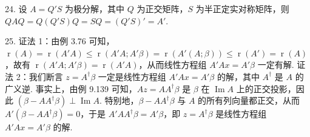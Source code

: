 \documentclass[UTF8,12pt,a4paper,fontset=fandol]{ctexart}
\begin{document}
24. 设 $A=Q'S$ 为极分解，其中 $Q$ 为正交矩阵，$S$ 为半正定实对称矩阵，则 $QAQ=Q(Q'S)Q=SQ=(Q'S)'=A'$.

25. 证法 1：由例 3.76 可知，$\operatorname{r}(A)=\operatorname{r}(A'A)\le \operatorname{r}(A'A;A'\beta)=\operatorname{r}(A'(A;\beta))\le \operatorname{r}(A')=\operatorname{r}(A)$，故有 $\operatorname{r}(A'A;A'\beta)=\operatorname{r}(A'A)$，从而线性方程组 $A'Ax=A'\beta$ 一定有解. 证法 2：我们断言 $z=A^\dagger\beta$ 一定是线性方程组 $A'Ax=A'\beta$ 的解，其中 $A^\dagger$ 是 $A$ 的广义逆. 事实上，由例 9.139 可知，$Az=AA^\dagger\beta$ 是 $\beta$ 在 $\operatorname{Im}A$ 上的正交投影，因此 $(\beta-AA^\dagger\beta)\perp\operatorname{Im}A$. 特别地，$\beta-AA^\dagger\beta$ 与 $A$ 的所有列向量都正交，从而 $A'(\beta-AA^\dagger\beta)=0$，于是 $A'AA^\dagger\beta=A'\beta$，即 $z=A^\dagger\beta$ 是线性方程组 $A'Ax=A'\beta$ 的解.
\end{document}
